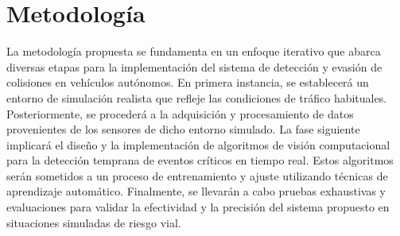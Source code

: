 \documentclass[10pt,letterpaper,final]{article}
\begin{document}
    \section*{Metodología}
    \justify
     La metodología propuesta se fundamenta en un enfoque iterativo que abarca diversas etapas para la implementación del sistema de detección
    y evasión de colisiones en vehículos autónomos. En primera instancia, se establecerá un entorno de simulación realista que refleje las condiciones de tráfico habituales.
    Posteriormente, se procederá a la adquisición y procesamiento de datos provenientes de los sensores de dicho entorno simulado. La fase siguiente implicará el diseño
    y la implementación de algoritmos de visión computacional para la detección temprana de eventos críticos en tiempo real. Estos algoritmos serán sometidos a un proceso
    de entrenamiento y ajuste utilizando técnicas de aprendizaje automático. Finalmente, se llevarán a cabo pruebas exhaustivas y evaluaciones para validar la efectividad
    y la precisión del sistema propuesto en situaciones simuladas de riesgo vial.
    
\end{document}
